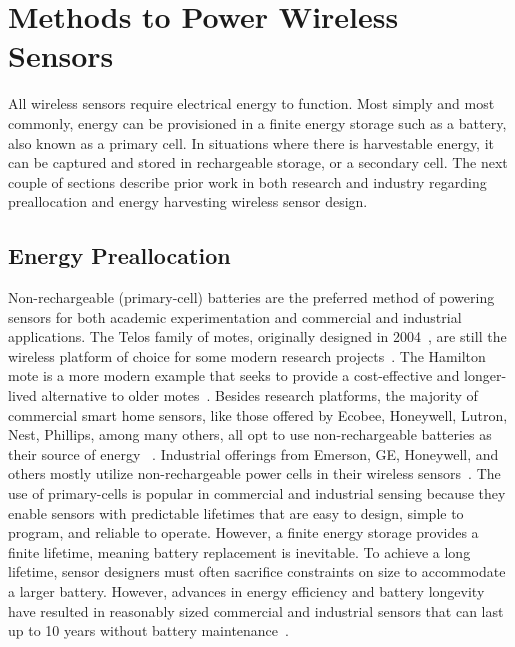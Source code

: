 
\section{Methods to Power Wireless Sensors}
\label{sec:background:methods}
All wireless sensors require electrical energy to function.
Most simply and most commonly, energy can be provisioned in a finite energy storage such as a battery, also known as a primary cell. 
In situations where there is harvestable energy, it can be captured and stored in rechargeable storage, or a secondary cell.
The next couple of sections describe prior work in both research and industry regarding preallocation and energy harvesting wireless sensor design.

\subsection{Energy Preallocation}
Non-rechargeable (primary-cell) batteries are the preferred
method of powering sensors for both academic experimentation
and commercial and industrial applications.
The Telos family of motes, originally designed in 2004~\cite{polastre2005telos},
are still the wireless platform of choice for some modern research projects~\cite{mohammad2018codecast,li2019privacy}.
The Hamilton mote is a more modern example that seeks to provide a cost-effective and longer-lived alternative to older motes~\cite{andersen2017hamilton}.
Besides research platforms, the majority of commercial smart home sensors, like those offered by Ecobee, Honeywell, Lutron, Nest, Phillips, among many others, all opt to use non-rechargeable batteries as their source of energy
~\cite{ecobeeSensor, honeywellThermostat, lutronSolutions, googleNestTemperature, hueSensor}.
Industrial offerings from Emerson, GE, Honeywell, and others mostly utilize non-rechargeable power cells in their wireless sensors~\cite{emersonRosemount,GEInsightMesh,honeywellOneWireless}.
The use of primary-cells is popular in commercial and industrial sensing because they enable sensors with predictable lifetimes that are easy to
design, simple to program, and reliable to operate.
However, a finite energy storage provides a finite lifetime, meaning battery replacement is inevitable.
To achieve a long lifetime, sensor designers must often sacrifice constraints on size to accommodate a larger battery.
However, advances in energy efficiency and battery longevity have resulted in reasonably sized commercial and industrial sensors that can last up to 10 years without battery maintenance~\cite{emersonRosemount,honeywellOneWireless, lutronSolutions}.

